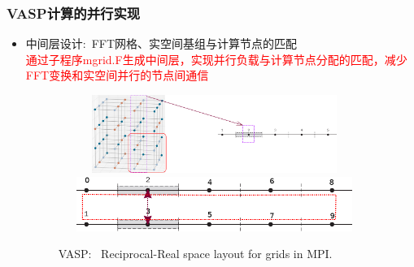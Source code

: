 \documentclass[cjk,slidestop,compress,mathserif,blue]{beamer}
\begin{document}
\frame
{
	\frametitle{\textrm{VASP}计算的并行实现}
	\begin{itemize}
	     \item 中间层设计:~\textrm{FFT}网格、实空间基组与计算节点的匹配\\
		     \textcolor{red}{通过子程序\textrm{mgrid.F}生成中间层，实现并行负载与计算节点分配的匹配，减少\textrm{FFT}变换和实空间并行的节点间通信}
\begin{figure}[h!]
		\vspace{-0.25in}
	\centering
\includegraphics[height=1.0in,width=4.0in,viewport=0 0 1500 450,clip]{Figures/VASP_FFT-MPI_Reciprocal.png}
\vskip 0.5pt
\includegraphics[height=0.7in,width=4.0in,viewport=0 0 730 150,clip]{Figures/VASP_FFT-MPI_Real.png}
\caption{\tiny \textrm{VASP:~ Reciprocal-Real space layout for grids in MPI.}}%
\label{MPI-FFT}
\end{figure} 
	\end{itemize}
}

\end{document}
